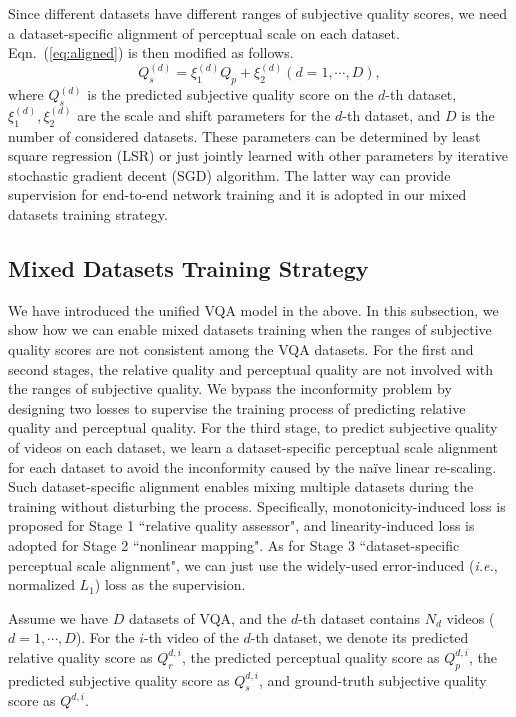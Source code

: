 \documentclass[twocolumn]{svjour3}          \smartqed  \usepackage{graphicx}
\begin{document}
Since different datasets have different ranges of subjective quality scores, we need a dataset-specific alignment of perceptual scale on each dataset. Eqn.~(\ref{eq:aligned}) is then modified as follows.
\begin{equation}\label{eq:specific aligned}
Q^{(d)}_s  = \xi_1^{(d)} Q_p + \xi_2^{(d)} (d=1, \cdots, D), 
\end{equation}
where $Q^{(d)}_s$ is the predicted subjective quality score on the $d$-th dataset, $\xi_1^{(d)}, \xi_2^{(d)}$ are the scale and shift parameters for the $d$-th dataset, and $D$ is the number of considered datasets. 
These parameters can be determined by least square regression (LSR) or just jointly learned with other parameters by iterative stochastic gradient decent (SGD) algorithm. 
The latter way can provide supervision for end-to-end network training and it is adopted in our mixed datasets training strategy.



\subsection{Mixed Datasets Training Strategy}
We have introduced the unified VQA model in the above. 
In this subsection, we show how we can enable mixed datasets training when the ranges of subjective quality scores are not consistent among the VQA datasets. 
For the first and second stages, the relative quality and perceptual quality are not involved with the ranges of subjective quality.
We bypass the inconformity problem by designing two losses to supervise the training process of predicting relative quality and perceptual quality. 
For the third stage, to predict subjective quality of videos on each dataset, we learn a dataset-specific perceptual scale alignment for each dataset to avoid the inconformity caused by the na\"ive linear re-scaling.
Such dataset-specific alignment enables mixing multiple datasets during the training without disturbing the process. 
Specifically, monotonicity-induced loss is proposed for Stage 1 ``relative quality assessor", and linearity-induced loss is adopted for Stage 2 ``nonlinear mapping". 
As for Stage 3 ``dataset-specific perceptual scale alignment", we can just use the widely-used error-induced (\textit{i.e.}, normalized $L_1$) loss as the supervision.

Assume we have $D$ datasets of VQA, and the $d$-th dataset contains $N_d$ videos ($d=1,\cdots, D$). 
For the $i$-th video of the $d$-th dataset, we denote its predicted relative quality score as $Q^{d, i}_r$, the predicted perceptual quality score as $Q^{d, i}_p$, the predicted subjective quality score as $Q^{d, i}_s$, and ground-truth subjective quality score as $Q^{d, i}$.
\end{document}
